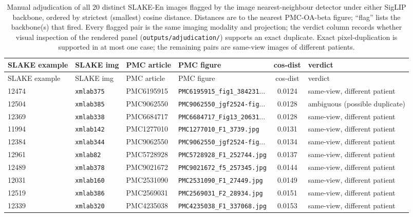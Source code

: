 \begin{longtable}{llllcl}
\caption{Manual adjudication of all 20 distinct SLAKE-En images flagged by the image nearest-neighbour detector under either SigLIP backbone, ordered by strictest (smallest) cosine distance. Distances are to the nearest PMC-OA-beta figure; ``flag'' lists the backbone(s) that fired. Every flagged pair is the same imaging modality and projection; the verdict column records whether visual inspection of the rendered panel (\texttt{outputs/adjudication/}) supports an exact duplicate. Exact pixel-duplication is supported in at most one case; the remaining pairs are same-view images of different patients.}\label{tab:adjudication}\\
\toprule
SLAKE example & SLAKE img & PMC article & PMC figure & cos-dist & verdict \\
\midrule
\endfirsthead
\toprule SLAKE example & SLAKE img & PMC article & PMC figure & cos-dist & verdict \\ \midrule \endhead
12474 & \texttt{xmlab375} & PMC6195915 & \texttt{PMC6195915\_fig1\_384231$\dots$} & 0.0124 & same-view, different patient \\
12504 & \texttt{xmlab385} & PMC9062550 & \texttt{PMC9062550\_jgf2524-fig$\dots$} & 0.0128 & ambiguous (possible duplicate) \\
12369 & \texttt{xmlab338} & PMC6684717 & \texttt{PMC6684717\_Fig13\_20631$\dots$} & 0.0128 & same-view, different patient \\
11994 & \texttt{xmlab142} & PMC1277010 & \texttt{PMC1277010\_F1\_3739.jpg} & 0.0131 & same-view, different patient \\
12384 & \texttt{xmlab344} & PMC9062550 & \texttt{PMC9062550\_jgf2524-fig$\dots$} & 0.0134 & same-view, different patient \\
12961 & \texttt{xmlab82} & PMC5728928 & \texttt{PMC5728928\_F1\_252744.jpg} & 0.0137 & same-view, different patient \\
12489 & \texttt{xmlab378} & PMC9021672 & \texttt{PMC9021672\_f5\_257345.jpg} & 0.0144 & same-view, different patient \\
12031 & \texttt{xmlab160} & PMC2531090 & \texttt{PMC2531090\_F1\_27449.jpg} & 0.0149 & same-view, different patient \\
12519 & \texttt{xmlab386} & PMC2569031 & \texttt{PMC2569031\_F2\_28934.jpg} & 0.0151 & same-view, different patient \\
12339 & \texttt{xmlab320} & PMC4235038 & \texttt{PMC4235038\_F1\_337068.jpg} & 0.0153 & same-view, different patient \\

\end{longtable}
